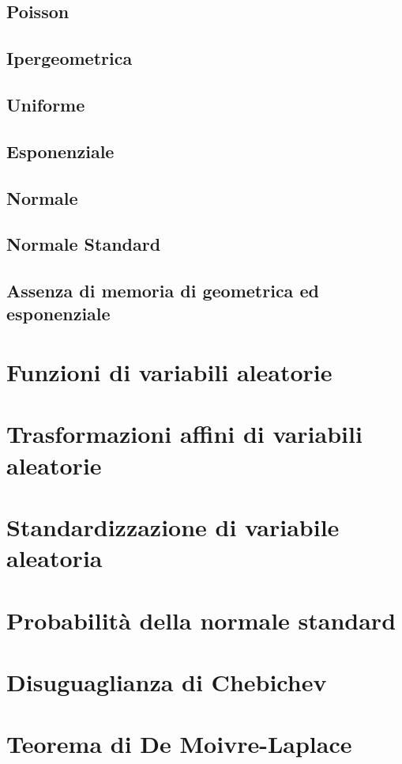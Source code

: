         \subsection{Poisson}
        \subsection{Ipergeometrica}
        \subsection{Uniforme}
        \subsection{Esponenziale}
        \subsection{Normale}
        \subsection{Normale Standard}
        \subsection*{Assenza di memoria di geometrica ed esponenziale}
    \section{Funzioni di variabili aleatorie}
    \section{Trasformazioni affini di variabili aleatorie}
    \section{Standardizzazione di variabile aleatoria}
    \section{Probabilità della normale standard}
    \section{Disuguaglianza di Chebichev}
    \section{Teorema di De Moivre-Laplace}
